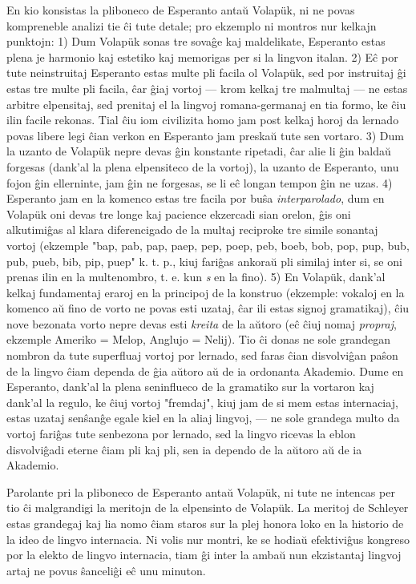    En kio konsistas la pliboneco de Esperanto anta\u u Volap\"uk, ni
ne povas kompreneble analizi tie \^ci tute detale; pro ekzemplo ni
montros nur kelkajn punktojn: 1) Dum Volap\"uk sonas tre sova\^ge
kaj maldelikate, Esperanto estas plena je harmonio kaj estetiko kaj
memorigas per si la lingvon italan. 2) E\^c por tute neinstruitaj
Esperanto estas multe pli facila ol Volap\"uk, sed por instruitaj
\^gi estas tre multe pli facila, \^car \^giaj vortoj --- krom kelkaj
tre malmultaj --- ne estas arbitre elpensitaj, sed prenitaj el la
lingvoj romana-germanaj en tia formo, ke \^ciu ilin facile rekonas.
Tial \^ciu iom civilizita homo jam post kelkaj horoj da lernado
povas libere legi \^cian verkon en Esperanto jam preska\u u tute sen
vortaro. 3) Dum la uzanto de Volap\"uk nepre devas \^gin konstante
ripetadi, \^car alie li \^gin balda\u u forgesas (dank'al la plena
elpensiteco de la vortoj), la uzanto de Esperanto, unu fojon \^gin
ellerninte, jam \^gin ne forgesas, se li e\^c longan tempon \^gin ne
uzas. 4) Esperanto jam en la komenco estas tre facila por bu\^sa
{\sl interparolado}, dum en Volap\"uk oni devas tre longe kaj
pacience ekzercadi sian orelon, \^gis oni alkutimi\^gas al klara
diferencigado de la multaj reciproke tre simile sonantaj vortoj
(ekzemple "bap, pab, pap, paep, pep, poep, peb, boeb, bob, pop,
pup, bub, pub, pueb, bib, pip, puep" k. t. p., kiuj fari\^gas
ankora\u u pli similaj inter si, se oni prenas ilin en la
multenombro, t. e. kun {\sl s} en la fino). 5) En Volap\"uk, dank'al
kelkaj fundamentaj eraroj en la principoj de la konstruo (ekzemple:
vokaloj en la komenco a\u u fino de vorto ne povas esti uzataj,
\^car ili estas signoj gramatikaj), \^ciu nove bezonata vorto nepre
devas esti {\sl kreita} de la a\u utoro (e\^c \^ciuj nomaj {\sl
propraj}, ekzemple Ameriko = Melop, Anglujo = Nelij). Tio \^ci donas
ne sole grandegan nombron da tute superfluaj vortoj por lernado, sed
faras \^cian disvolvi\^gan pa\^son de la lingvo \^ciam dependa de
\^gia a\u utoro a\u u de ia ordonanta Akademio. Dume en Esperanto,
dank'al la plena seninflueco de la gramatiko sur la vortaron kaj
dank'al la regulo, ke \^ciuj vortoj "fremdaj", kiuj jam de si mem
estas internaciaj, estas uzataj sen\^san\^ge egale kiel en la aliaj
lingvoj, --- ne sole grandega multo da vortoj fari\^gas tute
senbezona por lernado, sed la lingvo ricevas la eblon disvolvi\^gadi
eterne \^ciam pli kaj pli, sen ia dependo de la a\u utoro a\u u de
ia Akademio.

   Parolante pri la pliboneco de Esperanto anta\u u Volap\"uk, ni tute
ne intencas per tio \^ci malgrandigi la meritojn de la elpensinto de
Volap\"uk. La meritoj de Schleyer estas grandegaj kaj lia nomo
\^ciam staros sur la plej honora loko en la historio de la ideo de
lingvo internacia. Ni volis nur montri, ke se hodia\u u
efektivi\^gus kongreso por la elekto de lingvo internacia, tiam \^gi
inter la amba\u u nun ekzistantaj lingvoj artaj ne povus
\^sanceli\^gi e\^c unu minuton.

